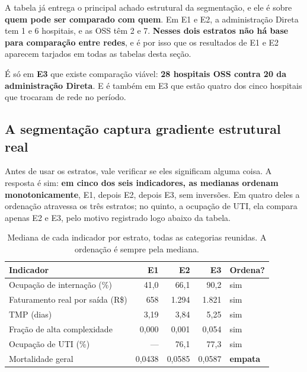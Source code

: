 A tabela já entrega o principal achado estrutural da segmentação, e ele é
sobre \textbf{quem pode ser comparado com quem}. Em E1 e E2, a administração
Direta tem 1 e 6 hospitais, e as OSS têm 2 e 7. \textbf{Nesses dois estratos
não há base para comparação entre redes}, e é por isso que os resultados de
E1 e E2 aparecem tarjados em todas as tabelas desta seção.

É só em \textbf{E3} que existe comparação viável: \textbf{28 hospitais OSS
contra 20 da administração Direta}. E é também em E3 que estão quatro dos
cinco hospitais que trocaram de rede no período.

\subsection{A segmentação captura gradiente estrutural real}

Antes de usar os estratos, vale verificar se eles significam alguma coisa. A
resposta é sim: \textbf{em cinco dos seis indicadores, as medianas ordenam
monotonicamente}, E1, depois E2, depois E3, sem inversões. Em quatro
deles a ordenação atravessa os três estratos; no quinto, a ocupação de
UTI, ela compara apenas E2 e E3, pelo motivo registrado logo abaixo da
tabela.

\begin{table}[H]
\centering
\caption{Mediana de cada indicador por estrato, todas as categorias
reunidas. A ordenação é sempre pela mediana.}
\label{tab:gradienteestratos}
\small
\begin{tabular}{lrrrl}
\toprule
Indicador & E1 & E2 & E3 & Ordena? \\
\midrule
Ocupação de internação (\%)   & 41,0   & 66,1   & 90,2   & sim \\
Faturamento real por saída (R\$) & 658    & 1.294  & 1.821  & sim \\
TMP (dias)                    & 3,19   & 3,84   & 5,25   & sim \\
Fração de alta complexidade   & 0,000  & 0,001  & 0,054  & sim \\
Ocupação de UTI (\%)          & ---    & 76,1   & 77,3   & sim \\
Mortalidade geral             & 0,0438 & 0,0585 & 0,0587 & \textbf{empata} \\
\bottomrule
\end{tabular}
\end{table}

